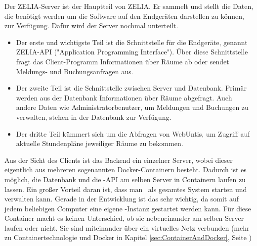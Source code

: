 
Der ZELIA-Server ist der Hauptteil von ZELIA. Er sammelt und stellt die Daten, die benötigt werden um die Software auf den Endgeräten darstellen zu können, zur Verfügung. Dafür wird der Server nochmal unterteilt.

\begin{itemize}
    \item Der erste und wichtigste Teil ist die Schnittstelle für die Endgeräte, genannt ZELIA-API ("Application Programming Interface"). Über diese Schnittstelle fragt das Client-Programm Informationen über Räume ab oder sendet Meldungs- und Buchungsanfragen aus.
    \item Der zweite Teil ist die Schnittstelle zwischen Server und Datenbank. Primär werden aus der Datenbank Informationen über Räume abgefragt. Auch andere Daten wie Administratorbenutzer, um Meldungen und Buchungen zu verwalten, stehen in der Datenbank zur Verfügung. 
    \item Der dritte Teil kümmert sich um die Abfragen von WebUntis, um Zugriff auf aktuelle Stundenpläne jeweiliger Räume zu bekommen.
\end{itemize}

Aus der Sicht des Clients ist das Backend ein einzelner Server, wobei dieser eigentlich aus mehreren sogenannten Docker-Containern besteht. Dadurch ist es möglich, die Datenbank und die \ZELIA-API am selben Server in Containern laufen zu lassen. Ein großer Vorteil daran ist, dass man \ZELIA\ als gesamtes System starten und verwalten kann. Gerade in der Entwicklung ist das sehr wichtig, da somit auf jedem beliebigen Computer eine eigene \ZELIA-Instanz gestartet werden kann. Für diese Container macht es keinen Unterschied, ob sie nebeneinander am selben Server laufen oder nicht. Sie sind miteinander über ein virtuelles Netz verbunden (mehr zu Containertechnologie und Docker in Kapitel \ref{sec:ContainerAndDocker}, Seite \pageref{sec:ContainerAndDocker})


